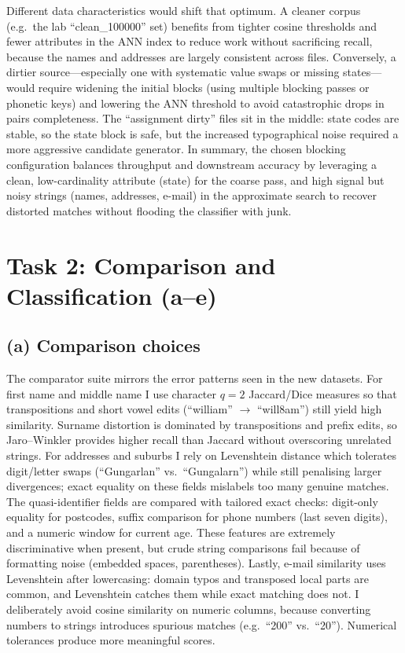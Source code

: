 \documentclass[11pt]{article}
\begin{document}
Different data characteristics would shift that optimum. A cleaner corpus (e.g.\ the lab ``clean\_100000'' set) benefits from tighter cosine thresholds and fewer attributes in the ANN index to reduce work without sacrificing recall, because the names and addresses are largely consistent across files. Conversely, a dirtier source---especially one with systematic value swaps or missing states---would require widening the initial blocks (using multiple blocking passes or phonetic keys) and lowering the ANN threshold to avoid catastrophic drops in pairs completeness. The ``assignment dirty'' files sit in the middle: state codes are stable, so the state block is safe, but the increased typographical noise required a more aggressive candidate generator. In summary, the chosen blocking configuration balances throughput and downstream accuracy by leveraging a clean, low-cardinality attribute (state) for the coarse pass, and high signal but noisy strings (names, addresses, e-mail) in the approximate search to recover distorted matches without flooding the classifier with junk.

\section*{Task 2: Comparison and Classification (a--e)}
\subsection*{(a) Comparison choices}
The comparator suite mirrors the error patterns seen in the new datasets. For first name and middle name I use character $q{=}2$ Jaccard/Dice measures so that transpositions and short vowel edits (``william'' $\rightarrow$ ``will8am'') still yield high similarity. Surname distortion is dominated by transpositions and prefix edits, so Jaro--Winkler provides higher recall than Jaccard without overscoring unrelated strings. For addresses and suburbs I rely on Levenshtein distance which tolerates digit/letter swaps (``Gungarlan'' vs.\ ``Gungalarn'') while still penalising larger divergences; exact equality on these fields mislabels too many genuine matches. The quasi-identifier fields are compared with tailored exact checks: digit-only equality for postcodes, suffix comparison for phone numbers (last seven digits), and a numeric window for current age. These features are extremely discriminative when present, but crude string comparisons fail because of formatting noise (embedded spaces, parentheses). Lastly, e-mail similarity uses Levenshtein after lowercasing: domain typos and transposed local parts are common, and Levenshtein catches them while exact matching does not. I deliberately avoid cosine similarity on numeric columns, because converting numbers to strings introduces spurious matches (e.g.\ ``200'' vs.\ ``20''). Numerical tolerances produce more meaningful scores.
\end{document}
